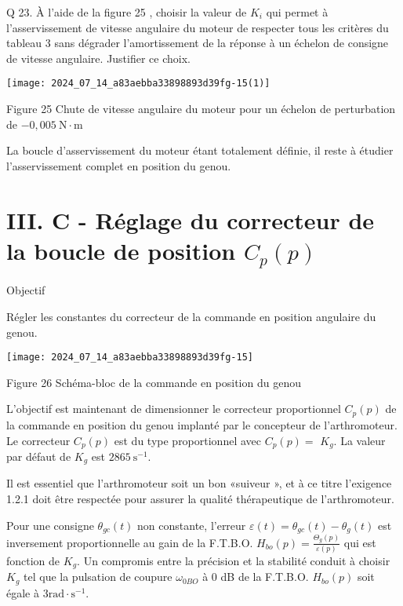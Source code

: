 Q 23. À l'aide de la figure 25 , choisir la valeur de $K_{i}$ qui permet à l'asservissement de vitesse angulaire du moteur de respecter tous les critères du tableau 3 sans dégrader l'amortissement de la réponse à un échelon de consigne de vitesse angulaire. Justifier ce choix.

\begin{center}
\texttt{[image: 2024\_07\_14\_a83aebba33898893d39fg-15(1)]}
\end{center}

Figure 25 Chute de vitesse angulaire du moteur pour un échelon de perturbation de $-0,005 \mathrm{~N} \cdot \mathrm{m}$

La boucle d'asservissement du moteur étant totalement définie, il reste à étudier l'asservissement complet en position du genou.

\section*{III. C - Réglage du correcteur de la boucle de position $C_{p}(p)$}
Objectif

Régler les constantes du correcteur de la commande en position angulaire du genou.

\begin{center}
\texttt{[image: 2024\_07\_14\_a83aebba33898893d39fg-15]}
\end{center}

Figure 26 Schéma-bloc de la commande en position du genou

L'objectif est maintenant de dimensionner le correcteur proportionnel $C_{p}(p)$ de la commande en position du genou implanté par le concepteur de l'arthromoteur. Le correcteur $C_{p}(p)$ est du type proportionnel avec $C_{p}(p)=$ $K_{g}$. La valeur par défaut de $K_{g}$ est $2865 \mathrm{~s}^{-1}$.

Il est essentiel que l'arthromoteur soit un bon «suiveur », et à ce titre l'exigence 1.2.1 doit être respectée pour assurer la qualité thérapeutique de l'arthromoteur.

Pour une consigne $\theta_{g c}(t)$ non constante, l'erreur $\varepsilon(t)=\theta_{g c}(t)-\theta_{g}(t)$ est inversement proportionnelle au gain de la F.T.B.O. $H_{b o}(p)=\frac{\Theta_{g}(p)}{\varepsilon(p)}$ qui est fonction de $K_{g}$. Un compromis entre la précision et la stabilité conduit à choisir $K_{g}$ tel que la pulsation de coupure $\omega_{0 B O}$ à 0 dB de la F.T.B.O. $H_{b o}(p)$ soit égale à $3 \mathrm{rad} \cdot \mathrm{s}^{-1}$.


